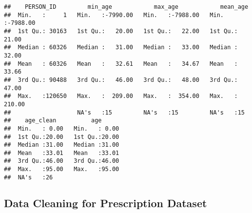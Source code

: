 \documentclass[]{article}
\begin{document}
\begin{verbatim}
##    PERSON_ID         min_age            max_age            mean_age       
##  Min.   :     1   Min.   :-7990.00   Min.   :-7988.00   Min.   :-7988.00  
##  1st Qu.: 30163   1st Qu.:   20.00   1st Qu.:   22.00   1st Qu.:   21.00  
##  Median : 60326   Median :   31.00   Median :   33.00   Median :   32.00  
##  Mean   : 60326   Mean   :   32.61   Mean   :   34.67   Mean   :   33.66  
##  3rd Qu.: 90488   3rd Qu.:   46.00   3rd Qu.:   48.00   3rd Qu.:   47.00  
##  Max.   :120650   Max.   :  209.00   Max.   :  354.00   Max.   :  210.00  
##                   NA's   :15         NA's   :15         NA's   :15        
##    age_clean          age       
##  Min.   : 0.00   Min.   : 0.00  
##  1st Qu.:20.00   1st Qu.:20.00  
##  Median :31.00   Median :31.00  
##  Mean   :33.01   Mean   :33.01  
##  3rd Qu.:46.00   3rd Qu.:46.00  
##  Max.   :95.00   Max.   :95.00  
##  NA's   :26
\end{verbatim}

\subsection{Data Cleaning for Prescription
Dataset}\label{data-cleaning-for-prescription-dataset}
\end{document}
